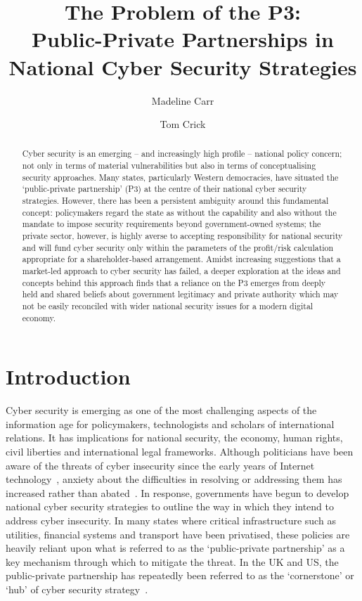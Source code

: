 \documentclass[a4paper,11pt]{article}
\title{\vspace{-2em}The Problem of the P3:\\Public-Private Partnerships in National Cyber Security Strategies}
\author[1]{Madeline Carr}
\author[2]{Tom Crick}
\affil[1]{Department of International Politics, Aberystwyth University}
\affil[2]{Department of Computing \& Information Systems, Cardiff Metropolitan University}
\affil[1]{\protect\url{madeline.carr@aber.ac.uk}}
\affil[2]{\protect\url{tcrick@cardiffmet.ac.uk}}
\date{ }
\begin{document}
\maketitle

\begin{abstract}
Cyber security is an emerging -- and increasingly high profile --
national policy concern; not only in terms of material vulnerabilities
but also in terms of conceptualising security approaches. Many states,
particularly Western democracies, have situated the `public-private
partnership' (P3) at the centre of their national cyber security
strategies. However, there has been a persistent ambiguity around this
fundamental concept: policymakers regard the state as without the
capability and also without the mandate to impose security
requirements beyond government-owned systems; the private sector,
however, is highly averse to accepting responsibility for national
security and will fund cyber security only within the parameters of
the profit/risk calculation appropriate for a shareholder-based
arrangement. Amidst increasing suggestions that a market-led approach
to cyber security has failed, a deeper exploration at the ideas and
concepts behind this approach finds that a reliance on the P3 emerges
from deeply held and shared beliefs about government legitimacy and
private authority which may not be easily reconciled with wider
national security issues for a modern digital economy.
\end{abstract}

\section{Introduction}

Cyber security is emerging as one of the most challenging aspects of
the information age for policymakers, technologists and scholars of
international relations. It has implications for national security,
the economy, human rights, civil liberties and international legal
frameworks. Although politicians have been aware of the threats of
cyber insecurity since the early years of Internet
technology~\cite{clinton:1992}, anxiety about the difficulties in
resolving or addressing them has increased rather than
abated~\cite{obama:2009,hocstc:2011,bisinfosecbreaches:2014}. In
response, governments have begun to develop national cyber security
strategies to outline the way in which they intend to address cyber
insecurity. In many states where critical infrastructure such as
utilities, financial systems and transport have been privatised, these
policies are heavily reliant upon what is referred to as the
`public-private partnership' as a key mechanism through which to
mitigate the threat. In the UK and US, the public-private partnership
has repeatedly been referred to as the `cornerstone' or `hub' of cyber
security strategy~\cite{clinton:1992,gwbush:2003,maude:2012}.
\end{document}
